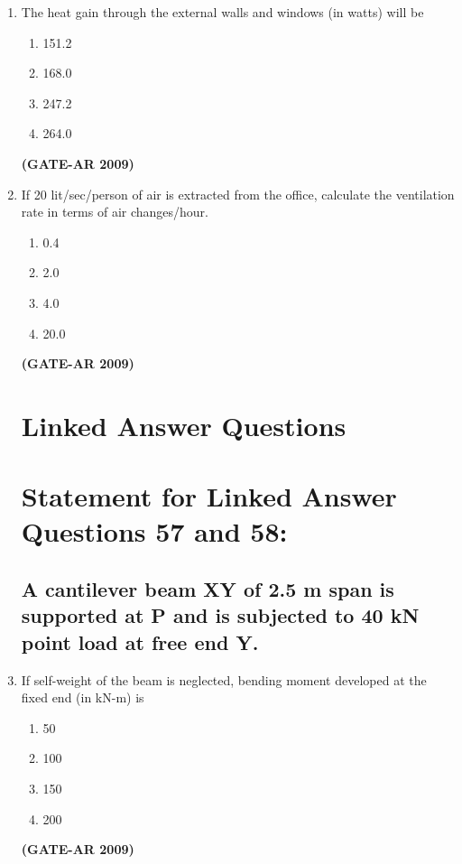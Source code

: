 \documentclass[a4paper,10pt]{article}
\begin{document}
\begin{enumerate}
    \item The heat gain through the external walls and windows (in watts) will be 
    \begin{multicols}{4}
	\begin{enumerate}
        \item 151.2
        \item 168.0
        \item 247.2
        \item 264.0
    \end{enumerate}
	\end{multicols}
    \hfill \textbf{(GATE-AR 2009)}

    \item If 20 lit/sec/person of air is extracted from the office, calculate the ventilation rate in terms of air changes/hour. 
    \begin{multicols}{4}
	\begin{enumerate}
        \item 0.4
        \item 2.0
        \item 4.0
        \item 20.0
    \end{enumerate}
	\end{multicols}
    \hfill \textbf{(GATE-AR 2009)}

\section*{Linked Answer Questions}

\section*{Statement for Linked Answer Questions 57 and 58:}
\subsection*{A cantilever beam XY of 2.5 m span is supported at P and is subjected to 40 kN point load at free end Y.}

    \item If self-weight of the beam is neglected, bending moment developed at the fixed end (in kN-m) is 
    \begin{multicols}{4}
	\begin{enumerate}
        \item 50
        \item 100
        \item 150
        \item 200
    \end{enumerate}
	\end{multicols}
    \hfill \textbf{(GATE-AR 2009)}


\end{enumerate}
\end{document}
